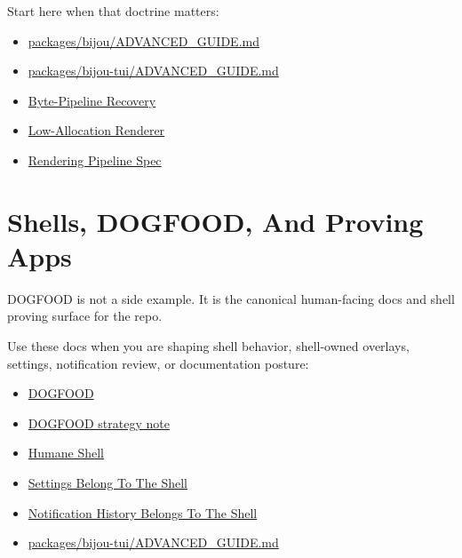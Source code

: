 Start here when that doctrine matters:

\begin{itemize}
\tightlist
\item
  \href{https://github.com/flyingrobots/bijou/blob/cbd70612140e7a450d764b3c7be1c6af878b99bc/packages/bijou/ADVANCED_GUIDE.md}{packages/bijou/ADVANCED\_GUIDE.md}
\item
  \href{https://github.com/flyingrobots/bijou/blob/cbd70612140e7a450d764b3c7be1c6af878b99bc/packages/bijou-tui/ADVANCED_GUIDE.md}{packages/bijou-tui/ADVANCED\_GUIDE.md}
\item
  \href{https://github.com/flyingrobots/bijou/blob/cbd70612140e7a450d764b3c7be1c6af878b99bc/docs/perf/RE-017-byte-pipeline.md}{Byte-Pipeline Recovery}
\item
  \href{https://github.com/flyingrobots/bijou/blob/cbd70612140e7a450d764b3c7be1c6af878b99bc/docs/strategy/low-allocation-renderer.md}{Low-Allocation Renderer}
\item
  \href{https://github.com/flyingrobots/bijou/blob/cbd70612140e7a450d764b3c7be1c6af878b99bc/docs/specs/rendering-pipeline.spec.json}{Rendering Pipeline Spec}
\end{itemize}

\section{Shells, DOGFOOD, And Proving Apps}\label{record-001-shells-dogfood-and-proving-apps}

DOGFOOD is not a side example. It is the canonical human-facing docs and shell proving surface for the repo.

Use these docs when you are shaping shell behavior, shell-owned overlays, settings, notification review, or documentation posture:

\begin{itemize}
\tightlist
\item
  \href{https://github.com/flyingrobots/bijou/blob/cbd70612140e7a450d764b3c7be1c6af878b99bc/docs/DOGFOOD.md}{DOGFOOD}
\item
  \href{https://github.com/flyingrobots/bijou/blob/cbd70612140e7a450d764b3c7be1c6af878b99bc/docs/strategy/dogfood.md}{DOGFOOD strategy note}
\item
  \href{https://github.com/flyingrobots/bijou/blob/cbd70612140e7a450d764b3c7be1c6af878b99bc/docs/strategy/humane-shell.md}{Humane Shell}
\item
  \href{https://github.com/flyingrobots/bijou/blob/cbd70612140e7a450d764b3c7be1c6af878b99bc/docs/strategy/settings-belong-to-the-shell.md}{Settings Belong To The Shell}
\item
  \href{https://github.com/flyingrobots/bijou/blob/cbd70612140e7a450d764b3c7be1c6af878b99bc/docs/strategy/notification-history-belongs-to-the-shell.md}{Notification History Belongs To The Shell}
\item
  \href{https://github.com/flyingrobots/bijou/blob/cbd70612140e7a450d764b3c7be1c6af878b99bc/packages/bijou-tui/ADVANCED_GUIDE.md}{packages/bijou-tui/ADVANCED\_GUIDE.md}
\end{itemize}

